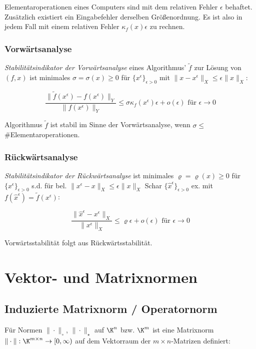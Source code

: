 Elementaroperationen eines Computers sind mit dem relativen Fehler $\epsilon$ behaftet. Zusätzlich existiert ein Eingabefehler derselben Größenordnung. Es ist also in jedem Fall mit einem relativen Fehler $\kappa_f(x)\epsilon$ zu rechnen.

\subsubsection*{Vorwärtsanalyse}

\emph{Stabilitätsindikator der Vorwärtsanalyse} eines Algorithmus' $\tilde f$ zur Lösung von $(f,x)$ ist minimales $\sigma = \sigma(x) \geq 0$ für $\{x^\epsilon\}_{\epsilon > 0}$ mit $\|x-x^\epsilon\|_X \leq \epsilon \|x\|_X$:

\vspace{-4mm}
$$\frac{\|\tilde f(x^\epsilon) - f(x^\epsilon)\|_Y}{\|f(x^\epsilon)\|_Y} \leq \sigma \kappa_f(x^\epsilon)\epsilon + o(\epsilon) \text{ für } \epsilon \to 0$$

Algorithmus $\tilde f$ ist stabil im Sinne der Vorwärtsanalyse, wenn $\sigma \leq$ \#Elementaroperationen.

\subsubsection*{Rückwärtsanalyse}

\emph{Stabilitätsindikator der Rückwärtsanalyse} ist minimales $\varrho = \varrho(x) \geq 0$ für $\{x^\epsilon\}_{\epsilon > 0}$ s.d. für bel. $\|x^\epsilon - x\|_X \leq \epsilon \|x\|_X$ Schar $\{\hat x^\epsilon\}_{\epsilon > 0}$ ex. mit $f(\hat x^\epsilon) = \tilde f(x^\epsilon)$:

\vspace{-2mm}
$$\frac{\|\hat x^\epsilon - x^\epsilon\|_X}{\|x^\epsilon\|_X} \leq \varrho\epsilon + o(\epsilon) \text{ für } \epsilon \to 0$$

Vorwärtsstabilität folgt aus Rückwärtsstabilität.

\section*{Vektor- und Matrixnormen}

\subsection*{Induzierte Matrixnorm / Operatornorm}

Für Normen $\| \cdot \|_\circ$, $\| \cdot \|_\star$ auf $\K^n$ bzw. $\K^m$ ist eine Matrixnorm $\| \cdot \| : \K^{m \times n} \rightarrow [0,\infty)$ auf dem Vektorraum der $m \times n$-Matrizen definiert:

